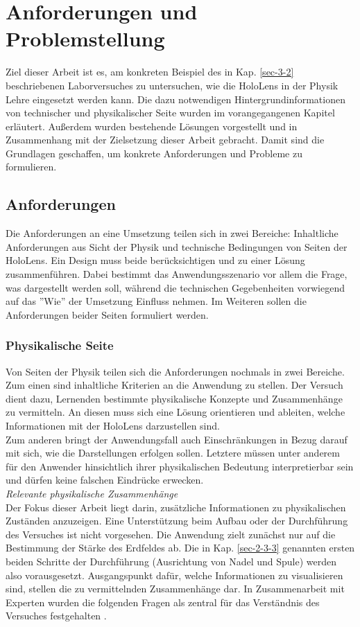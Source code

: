 \section{Anforderungen und Problemstellung}
\label{sec-3}
Ziel dieser Arbeit ist es, am konkreten Beispiel des in Kap. \ref{sec-3-2} beschriebenen Laborversuches zu untersuchen, wie die HoloLens in der Physik Lehre eingesetzt werden kann. Die dazu notwendigen Hintergrundinformationen von technischer und physikalischer Seite wurden im vorangegangenen Kapitel erläutert. Außerdem wurden bestehende Lösungen vorgestellt und in Zusammenhang mit der Zielsetzung dieser Arbeit gebracht. Damit sind die Grundlagen geschaffen, um konkrete Anforderungen und Probleme zu formulieren.

\subsection{Anforderungen}
\label{sec-3-1}
Die Anforderungen an eine Umsetzung teilen sich in zwei Bereiche: Inhaltliche Anforderungen aus Sicht der Physik und technische Bedingungen von Seiten der HoloLens. Ein Design muss beide berücksichtigen und zu einer Lösung zusammenführen. Dabei bestimmt das Anwendungsszenario vor allem die Frage, was dargestellt werden soll, während die technischen Gegebenheiten vorwiegend auf das ''Wie'' der Umsetzung Einfluss nehmen. Im Weiteren sollen die Anforderungen beider Seiten formuliert werden.

\subsubsection{Physikalische Seite}
\label{sec-3-1-1}
Von Seiten der Physik teilen sich die Anforderungen nochmals in zwei Bereiche. Zum einen sind inhaltliche Kriterien an die Anwendung zu stellen. Der Versuch dient dazu, Lernenden bestimmte physikalische Konzepte und Zusammenhänge zu vermitteln. An diesen muss sich eine Lösung orientieren und ableiten, welche Informationen mit der HoloLens darzustellen sind.\\
\noindent\hspace*{5mm}
Zum anderen bringt der Anwendungsfall auch Einschränkungen in Bezug darauf mit sich, wie die Darstellungen erfolgen sollen. Letztere müssen unter anderem für den Anwender hinsichtlich ihrer physikalischen Bedeutung interpretierbar sein und dürfen keine falschen Eindrücke erwecken.\\

\textit{Relevante physikalische Zusammenhänge}\\
Der Fokus dieser Arbeit liegt darin, zusätzliche Informationen zu physikalischen Zuständen anzuzeigen. Eine Unterstützung beim Aufbau oder der Durchführung des Versuches ist nicht vorgesehen. Die Anwendung zielt zunächst nur auf die Bestimmung der Stärke des Erdfeldes ab. Die in Kap. \ref{sec-2-3-3} genannten ersten beiden Schritte der Durchführung (Ausrichtung von Nadel und Spule) werden also vorausgesetzt. Ausgangspunkt dafür, welche Informationen zu visualisieren sind, stellen die zu vermittelnden Zusammenhänge dar. In Zusammenarbeit mit Experten wurden die folgenden Fragen als zentral für das Verständnis des Versuches festgehalten \cite{Reinholz18}.

